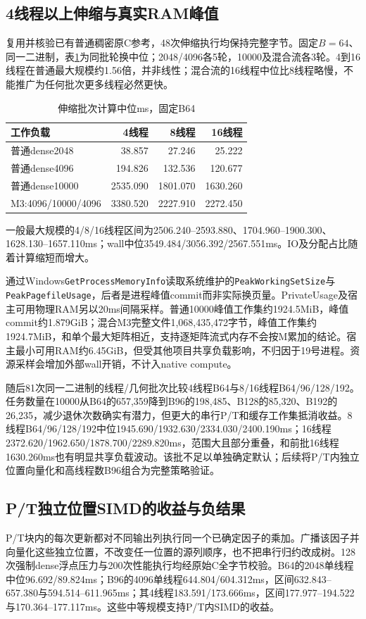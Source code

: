 \documentclass[UTF8,a4paper,11pt]{ctexart}
\begin{document}
\subsection{4线程以上伸缩与真实RAM峰值}
复用并核验已有普通稠密原C参考，48次伸缩执行均保持完整字节。固定$B=64$、同一二进制，表\ref{tab:scaling}为同批轮换中位；2048/4096各5轮，10000及混合流各3轮。4到16线程在普通最大规模约1.56倍，并非线性；混合流的16线程中位比8线程略慢，不能推广为任何批次更多线程必然更快。
\begin{table}[htbp]\centering\small
\caption{伸缩批次计算中位ms，固定B64}\label{tab:scaling}
\begin{tabular}{lrrr}\toprule
工作负载&4线程&8线程&16线程\\\midrule
普通dense2048&38.857&27.246&25.222\\
普通dense4096&194.826&132.536&120.677\\
普通dense10000&2535.090&1801.070&1630.260\\
M3:4096/10000/4096&3380.520&2227.910&2272.450\\\bottomrule
\end{tabular}
\end{table}
一般最大规模的4/8/16线程区间为2506.240--2593.880、1704.960--1900.300、1628.130--1657.110ms；wall中位3549.484/3056.392/2567.551ms。IO及分配占比随着计算缩短而增大。

通过Windows\texttt{GetProcessMemoryInfo}读取系统维护的\texttt{PeakWorkingSetSize}与\texttt{PeakPagefileUsage}，后者是进程峰值commit而非实际换页量\cite{winmemory}。PrivateUsage及宿主可用物理RAM另以20ms间隔采样。普通10000峰值工作集约1924.5MiB，峰值commit约1.879GiB；混合M3完整文件1,068,435,472字节，峰值工作集约1924.7MiB，和单个最大矩阵相近，支持逐矩阵流式内存不会按M累加的结论。宿主最小可用RAM约6.45GiB，但受其他项目共享负载影响，不归因于19号进程。资源采样会增加外部wall开销，不计入native compute。

随后81次同一二进制的线程/几何批次比较4线程B64与8/16线程B64/96/128/192。任务数量在10000从B64的657,359降到B96的198,485、B128的85,320、B192的26,235，减少退休次数确实有潜力，但更大的串行P/T和缓存工作集抵消收益。8线程B64/96/128/192中位1945.690/1932.630/2334.030/2400.190ms；16线程2372.620/1962.650/1878.700/2289.820ms，范围大且部分重叠，和前批16线程1630.260ms也有明显共享负载波动。该批不足以单独确定默认；后续将P/T内独立位置向量化和高线程数B96组合为完整策略验证。

\subsection{P/T独立位置SIMD的收益与负结果}
P/T块内的每次更新都对不同输出列执行同一个已确定因子的乘加。广播该因子并向量化这些独立位置，不改变任一位置的源列顺序，也不把串行归约改成树。128次强制dense浮点压力与200次性能执行均经原始C全字节校验。B64的2048单线程中位96.692/89.824ms；B96的4096单线程644.804/604.312ms，区间632.843--657.380与594.514--611.965ms；其4线程183.591/173.666ms，区间177.977--194.522与170.364--177.117ms。这些中等规模支持P/T内SIMD的收益。
\end{document}
